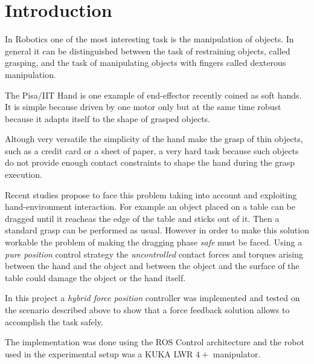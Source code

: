 \section*{Introduction}
In Robotics one of the most interesting task is the manipulation of objects. In general
it can be distinguished between the task of restraining objects, called grasping,
and the task of manipulating objects with fingers called dexterous manipulation.
\par
The Pisa/IIT Hand \cite{Catalano2014} is one example of end-effector recently coined as soft hands.
It is simple because driven by one motor only
but at the same time robust because it adapts itself to the shape of grasped objects.
\par
Altough very versatile the simplicity of the hand make the grasp of thin objects,
such as a credit card or a sheet of paper, a very hard task
because such objects do not provide enough contact constraints to shape the hand during the grasp execution. %
\par
Recent studies \cite{Bonilla2015} propose to face this problem taking into account
and exploiting hand-environment interaction. For example an object placed on a table
can be dragged until it reacheas the edge of the table and sticks out of it.
Then a standard grasp can be performed as usual. However in order to make
this solution workable the problem of making the dragging phase \emph{safe} must be faced.
Using a \emph{pure position} control strategy the \emph{uncontrolled} contact forces and torques
arising between the hand and the object and between the object and the surface of the table
could damage the object or the hand itself.
\par
In this project a \emph{hybrid force position} controller was implemented and tested on the
scenario described above to show that a force feedback solution allows to accomplish the task safely.
\par
The implementation was done using the ROS Control architecture and the robot used
in the experimental setup was a KUKA LWR $4+$ manipulator.

